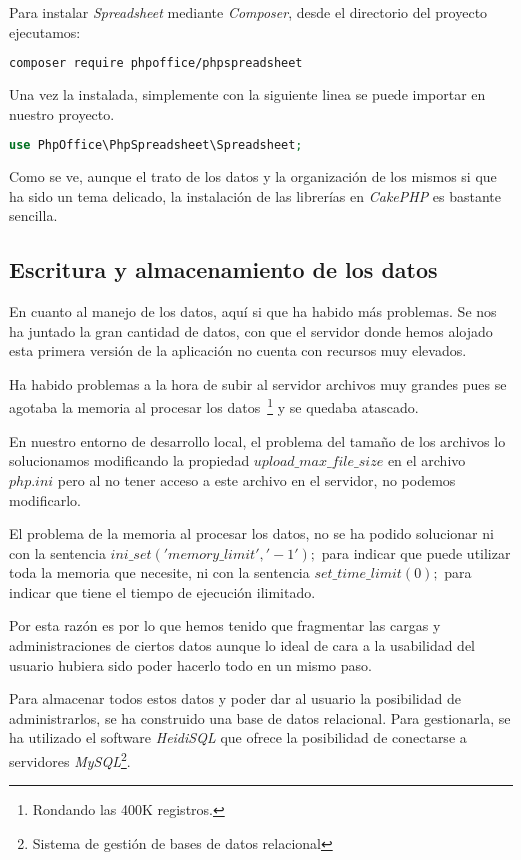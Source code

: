 Para instalar \textit{Spreadsheet} mediante \textit{Composer}, desde el directorio del proyecto ejecutamos:

\begin{lstlisting}[language=bash]
composer require phpoffice/phpspreadsheet
\end{lstlisting}

Una vez la instalada, simplemente con la siguiente linea se puede importar en nuestro proyecto.

\begin{lstlisting}[language=PHP]
use PhpOffice\PhpSpreadsheet\Spreadsheet;
\end{lstlisting}

Como se ve, aunque el trato de los datos y la organización de los mismos si que ha sido un tema delicado, la instalación de las librerías en \textit{CakePHP} es bastante sencilla.

\subsection{Escritura y almacenamiento de los datos}

En cuanto al manejo de los datos, aquí si que ha habido más problemas. Se nos ha juntado la gran cantidad de datos, con que el servidor donde hemos alojado esta primera versión de la aplicación no cuenta con recursos muy elevados.

Ha habido problemas a la hora de subir al servidor archivos muy grandes pues se agotaba la memoria al procesar los datos~\footnote{Rondando las 400K registros.} y se quedaba atascado. 

En nuestro entorno de desarrollo local, el problema del tamaño de los archivos lo solucionamos modificando la propiedad $upload\_max\_file\_size$ en el archivo $php.ini$ pero al no tener acceso a este archivo en el servidor, no podemos modificarlo. 

El problema de la memoria al procesar los datos, no se ha podido solucionar ni con la sentencia $ini\_set('memory\_limit', '-1');$ para indicar que puede utilizar toda la memoria que necesite, ni con la sentencia $set\_time\_limit(0);$ para indicar que tiene el tiempo de ejecución ilimitado. 

Por esta razón es por lo que hemos tenido que fragmentar las cargas y administraciones de ciertos datos aunque lo ideal de cara a la usabilidad del usuario hubiera sido poder hacerlo todo en un mismo paso.

Para almacenar todos estos datos y poder dar al usuario la posibilidad de administrarlos, se ha construido una base de datos relacional. Para gestionarla, se ha utilizado el software \textit{HeidiSQL} que ofrece la posibilidad de conectarse a servidores \textit{MySQL}\footnote{Sistema de gestión de bases de datos relacional}.

